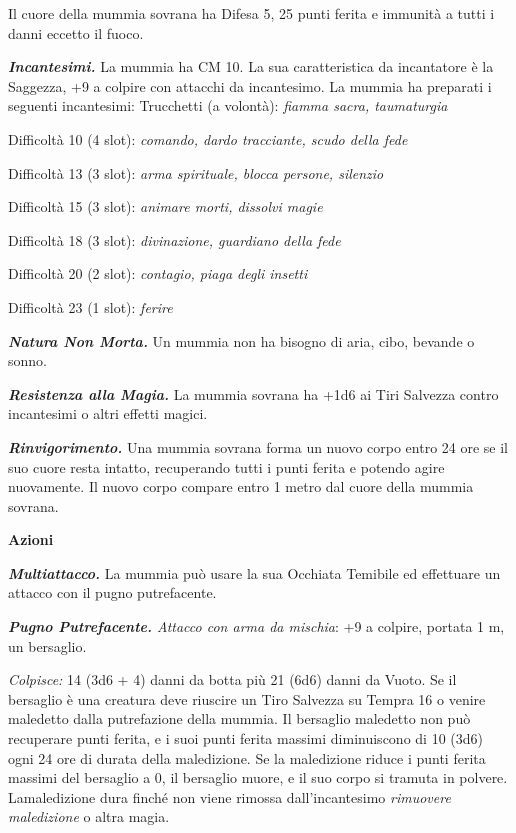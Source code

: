 \begin{multicols}{2}
Il cuore della mummia sovrana ha Difesa 5, 25 punti ferita e immunità a tutti i danni eccetto il fuoco.

\emph{\textbf{Incantesimi.}} La mummia ha CM 10. La sua caratteristica da incantatore è la Saggezza, +9 a colpire con attacchi da incantesimo. La mummia ha preparati i seguenti incantesimi: Trucchetti (a volontà): \emph{fiamma sacra, taumaturgia}

Difficoltà 10 (4 slot): \emph{comando, dardo tracciante, scudo della fede}

Difficoltà 13 (3 slot): \emph{arma spirituale, blocca persone, silenzio}

Difficoltà 15 (3 slot): \emph{animare morti, dissolvi magie}

Difficoltà 18 (3 slot): \emph{divinazione, guardiano della fede}

Difficoltà 20 (2 slot): \emph{contagio, piaga degli insetti}

Difficoltà 23 (1 slot): \emph{ferire}

\emph{\textbf{Natura Non Morta.}} Un mummia non ha bisogno di aria, cibo, bevande o sonno.

\emph{\textbf{Resistenza alla Magia.}} La mummia sovrana ha +1d6 ai Tiri Salvezza contro incantesimi o altri effetti magici.

\emph{\textbf{Rinvigorimento.}} Una mummia sovrana forma un nuovo corpo entro 24 ore se il suo cuore resta intatto, recuperando tutti i punti ferita e potendo agire nuovamente. Il nuovo corpo compare entro 1 metro dal cuore della mummia sovrana.

\textbf{Azioni}

\emph{\textbf{Multiattacco.}} La mummia può usare la sua Occhiata Temibile ed effettuare un attacco con il pugno putrefacente.

\emph{\textbf{Pugno Putrefacente.} Attacco con arma da mischia}: +9 a colpire, portata 1 m, un bersaglio.

\emph{Colpisce:} 14 (3d6 + 4) danni da botta più 21 (6d6) danni da Vuoto. Se il bersaglio è una creatura deve riuscire un Tiro Salvezza su Tempra 16 o venire maledetto dalla putrefazione della mummia. Il bersaglio maledetto non può recuperare punti ferita, e i suoi punti ferita massimi diminuiscono di 10 (3d6) ogni 24 ore di durata della maledizione. Se la maledizione riduce i punti ferita massimi del bersaglio a 0, il bersaglio muore, e il suo corpo si tramuta in polvere. Lamaledizione dura finché non viene rimossa dall'incantesimo  \emph{rimuovere maledizione} o altra magia.


\end{multicols}
